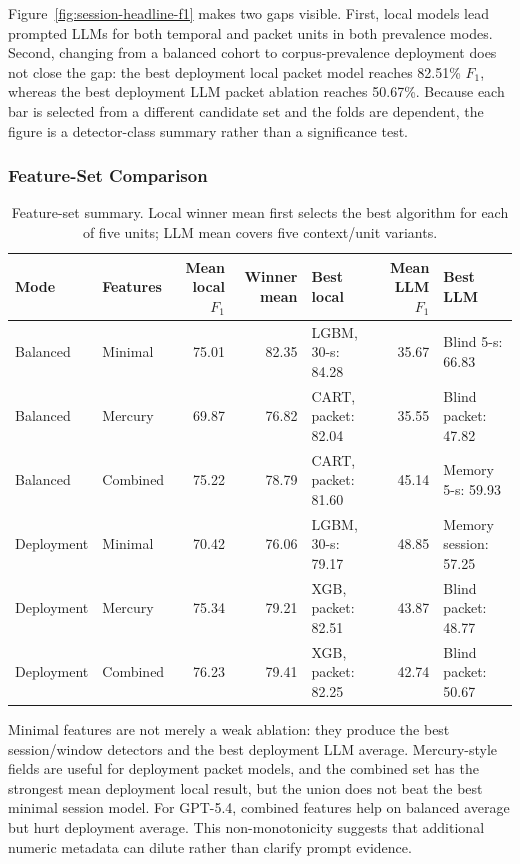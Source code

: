 \documentclass[letterpaper,twocolumn,10pt]{article}
\begin{document}
Figure~\ref{fig:session-headline-f1} makes two gaps visible. First, local models lead prompted LLMs for both temporal and packet units in both prevalence modes. Second, changing from a balanced cohort to corpus-prevalence deployment does not close the gap: the best deployment local packet model reaches 82.51\% $F_1$, whereas the best deployment LLM packet ablation reaches 50.67\%. Because each bar is selected from a different candidate set and the folds are dependent, the figure is a detector-class summary rather than a significance test.

\subsubsection{Feature-Set Comparison}

\begin{table}[t]
\centering
\caption{Feature-set summary. Local winner mean first selects the best algorithm for each of five units; LLM mean covers five context/unit variants.}
\label{tab:session-features}
\footnotesize
\begin{tabularx}{\textwidth}{llrrXrX}
\toprule
Mode & Features & Mean local $F_1$ & Winner mean & Best local & Mean LLM $F_1$ & Best LLM \\
\midrule
Balanced & Minimal & 75.01 & 82.35 & LGBM, 30-s: 84.28 & 35.67 & Blind 5-s: 66.83 \\
Balanced & Mercury & 69.87 & 76.82 & CART, packet: 82.04 & 35.55 & Blind packet: 47.82 \\
Balanced & Combined & 75.22 & 78.79 & CART, packet: 81.60 & 45.14 & Memory 5-s: 59.93 \\
Deployment & Minimal & 70.42 & 76.06 & LGBM, 30-s: 79.17 & 48.85 & Memory session: 57.25 \\
Deployment & Mercury & 75.34 & 79.21 & XGB, packet: 82.51 & 43.87 & Blind packet: 48.77 \\
Deployment & Combined & 76.23 & 79.41 & XGB, packet: 82.25 & 42.74 & Blind packet: 50.67 \\
\bottomrule
\end{tabularx}
\end{table}

Minimal features are not merely a weak ablation: they produce the best session/window detectors and the best deployment LLM average. Mercury-style fields are useful for deployment packet models, and the combined set has the strongest mean deployment local result, but the union does not beat the best minimal session model. For GPT-5.4, combined features help on balanced average but hurt deployment average. This non-monotonicity suggests that additional numeric metadata can dilute rather than clarify prompt evidence.
\end{document}
